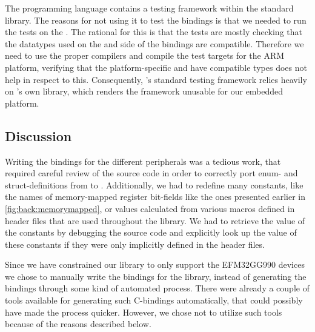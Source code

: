 The {\rust} programming language contains a testing framework within the standard library.
The reasons for not using it to test the bindings is that we needed to run the tests on the {\gecko}.
The rational for this is that the tests are mostly checking that the datatypes used on the {\rust} and {\C} side of the bindings are compatible.
Therefore we need to use the proper compilers and compile the test targets for the ARM platform, verifying that the platform-specific  and {\rustc} have compatible types does not help in respect to this.
Consequently, {\rust}'s standard testing framework relies heavily on {\rust}'s own {\std} library, which renders the framework unusable for our embedded platform.



\subsection{Discussion}

Writing the bindings for the different peripherals was a tedious work, that required careful review of the {\emlib} source code in order to correctly port enum- and struct-definitions from {\C} to {\rust}.
Additionally, we had to redefine many constants, like the names of memory-mapped register bit-fields like the ones presented earlier in \autoref{fig:back:memorymapped}, or values calculated from various {\C} macros defined in header files that are used throughout the library.
We had to retrieve the value of the constants by debugging the source code and explicitly look up the value of these constants if they were only implicitly defined in the header files.

Since we have constrained our library to only support the EFM32GG990 devices we chose to manually write the bindings for the library, instead of generating the bindings through some kind of automated process.
There were already a couple of tools available for generating such C-bindings automatically, that could possibly have made the process quicker.
However, we chose not to utilize such tools because of the reasons described below.

